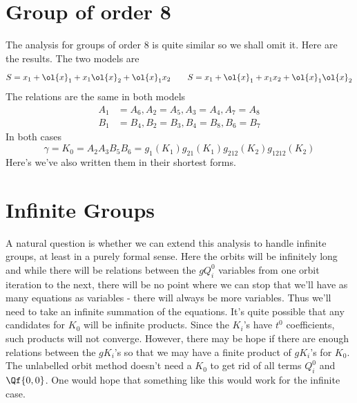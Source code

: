 \section{Group of order 8}
The analysis for groups of order 8 is quite similar so we shall omit it. Here are the results. 
The two models are
\[
	S = x_1+\ol{x}_1+x_1\ol{x}_2+\ol{x}_1x_2\quad\quad S  = x_1+\ol{x}_1+x_1x_2+\ol{x}_1\ol{x}_2
\]
The relations are the same in both models
\begin{align*}
	A_1 &= A_6, A_2 = A_5, A_3 = A_4, A_7 = A_8\\
	B_1 &= B_4, B_2 = B_3, B_4 = B_8, B_6 = B_7
\end{align*}
In both cases
\[
	\gamma = K_0 =  A_2 A_3 B_5 B_6 = g_1(K_1) g_{21}(K_1) g_{212}(K_2) g_{1212}(K_2)
\]
Here's we've also written them in their shortest forms.

\section{Infinite Groups}

A natural question is whether we can extend this analysis to handle infinite groups, at least in a purely formal sense. Here the orbits will be infinitely long and while there will be relations between the $g Q_i^0$ variables from one orbit iteration to the next, there will be no point where we can stop that we'll have as many equations as variables - there will always be more variables. Thus we'll need to take an infinite summation of the equations. It's quite possible that any candidates for $K_0$ will be infinite products. Since the $K_i$'s have $t^0$ coefficients, such products will not converge. However, there may be hope if there are enough relations between the $g K_i$'s so that we may have a finite product of $g K_i$'s for $K_0$. The unlabelled orbit method doesn't need a $K_0$ to get rid of all terms $Q_i^0$ and $\Qf{0,0}$. One would hope that something like this would work for the infinite case.

\endinput
